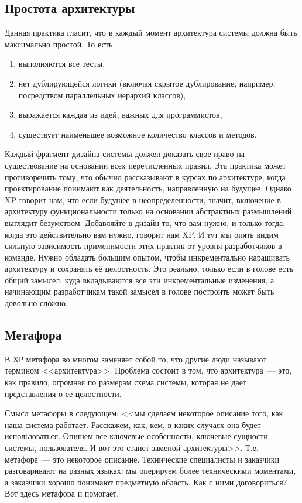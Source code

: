 \documentclass{../../text-style}
\begin{document}
\subsection{Простота архитектуры}

Данная практика гласит, что в каждый момент архитектура системы должна быть максимально простой. То есть,

\begin{enumerate}
    \item выполняются все тесты,
    \item нет дублирующейся логики (включая скрытое дублирование, например, посредством параллельных иерархий классов),
    \item выражается каждая из идей, важных для программистов,
    \item существует наименьшее возможное количество классов и методов.
\end{enumerate}

Каждый фрагмент дизайна системы должен доказать свое право на существование на основании всех перечисленных правил. Эта практика может противоречить тому, что обычно рассказывают в курсах по архитектуре, когда проектирование понимают как деятельность, направленную на будущее. Однако XP говорит нам, что если будущее в неопределенности, значит, включение в архитектуру функциональности только на основании абстрактных размышлений выглядит безумством. Добавляйте в дизайн то, что вам нужно, и только тогда, когда это действительно вам нужно, говорит нам XP. И тут мы опять видим сильную зависимость применимости этих практик от уровня разработчиков в команде. Нужно обладать большим опытом, чтобы инкрементально наращивать архитектуру и сохранять её целостность. Это реально, только если в голове есть общий замысел, куда вкладываются все эти инкрементальные изменения, а начинающим разработчикам такой замысел в голове построить может быть довольно сложно.

\subsection{Метафора}

В ХР метафора во многом заменяет собой то, что другие люди называют термином <<архитектура>>. Проблема состоит в том, что архитектура~--- это, как правило, огромная по размерам схема системы, которая не дает представления о ее целостности.

Смысл метафоры в следующем: <<мы сделаем некоторое описание того, как наша система работает. Расскажем, как, кем, в каких случаях она будет использоваться. Опишем все ключевые особенности, ключевые сущности системы, пользователя. И вот это станет заменой архитектуры>>. Т.е. метафора~--- это некоторое описание. Технические специалисты и заказчики разговаривают на разных языках:  мы оперируем более техническими моментами, а заказчики хорошо понимают предметную область. Как с ними договориться? Вот здесь метафора и помогает.
\end{document}
